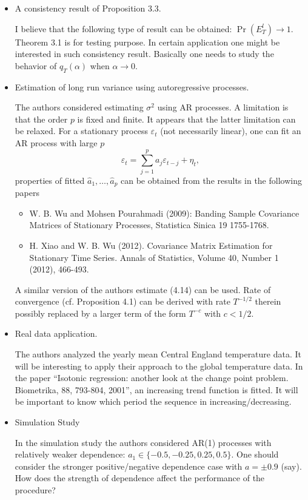 \documentclass[a4paper,12pt]{article}
\begin{document}
 

\vspace{0.25cm}

\begin{itemize}
\item A consistency result of Proposition 3.3.

I believe that the following type of result can be obtained: $\Pr (E^l_T) \to 1$. Theorem 3.1 is for testing purpose. In certain application one might be interested in such consistency result. Basically one needs to study the behavior of $q_T (\alpha)$ when $\alpha \to 0$.

\item Estimation of long run variance using autoregressive processes.

The authors considered estimating $\sigma^2$ using AR processes. A limitation is that the order $p$ is fixed and finite. It appears that the latter limitation can be relaxed. For a stationary process $\varepsilon_t$ (not necessarily linear), one can fit an AR process with large $p$
$$ \varepsilon_t = \sum_{j=1}^p a_j \varepsilon_{t-j} + \eta_t,$$
properties of fitted $\widehat{a}_1, \ldots, \widehat{a}_p$ can be obtained from the results in the following papers
\begin{itemize}
\item W. B. Wu and Mohsen Pourahmadi (2009): Banding Sample Covariance Matrices of Stationary Processes, Statistica Sinica 19 1755-1768.
\item H. Xiao and W. B. Wu (2012). Covariance Matrix Estimation for Stationary Time Series. Annals of Statistics, Volume 40, Number 1 (2012), 466-493.
\end{itemize}
A similar version of the authors estimate (4.14) can be used. Rate of convergence (cf. Proposition 4.1) can be derived with rate $T^{-1/2}$ therein possibly replaced by a larger term of the form $T^{-c}$ with $c < 1/2$.

\item Real data application.

The authors analyzed the yearly mean Central England temperature data. It will be interesting to apply their approach to the global temperature data. In the paper ``Isotonic regression: another look at the change point problem. Biometrika, 88, 793-804, 2001'', an increasing trend function is fitted. It will be important to know which period the sequence in increasing/decreasing.

\item Simulation Study

In the simulation study the authors considered AR(1) processes with relatively weaker dependence: $a_1 \in \{-0.5, -0.25, 0.25, 0.5\}$. One should consider the stronger positive/negative dependence case with $a = \pm 0.9$ (say). How does the strength of dependence affect the performance of the procedure?

\end{itemize}
\end{document}
